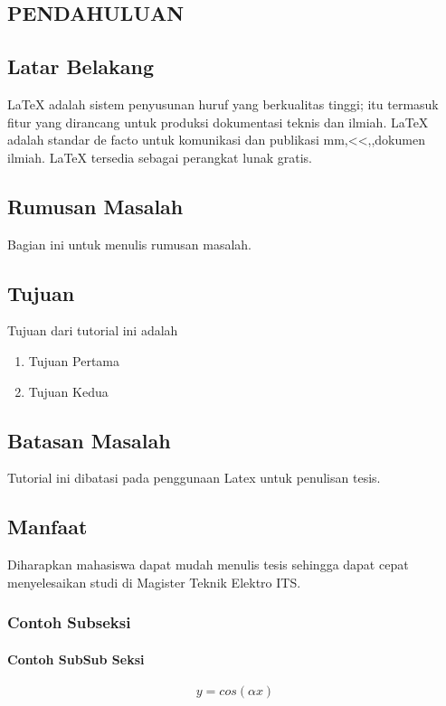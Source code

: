 
\begin{spacing}{1.2}
  \chapter{PENDAHULUAN}
\end{spacing}


\vspace{4ex}


\section{Latar Belakang}
LaTeX adalah sistem penyusunan huruf yang berkualitas tinggi; itu termasuk fitur yang dirancang untuk produksi dokumentasi teknis dan ilmiah. LaTeX adalah standar de facto untuk komunikasi dan publikasi mm,<<,,dokumen ilmiah. LaTeX tersedia sebagai perangkat lunak gratis.

\section{Rumusan Masalah}
Bagian ini untuk menulis rumusan masalah.
\section{Tujuan}
Tujuan dari tutorial ini adalah \cite{Koza1996}
\begin{enumerate}
	\item Tujuan Pertama
	\item Tujuan Kedua
\end{enumerate}
\section{Batasan Masalah}
Tutorial ini dibatasi pada penggunaan Latex untuk penulisan tesis. 
\section{Manfaat}
Diharapkan mahasiswa dapat mudah menulis tesis sehingga dapat cepat menyelesaikan studi di Magister Teknik Elektro ITS.
\subsection{Contoh Subseksi }
\subsubsection{Contoh SubSub Seksi}

\begin{equation}
y=cos(\alpha x)
\end{equation}
